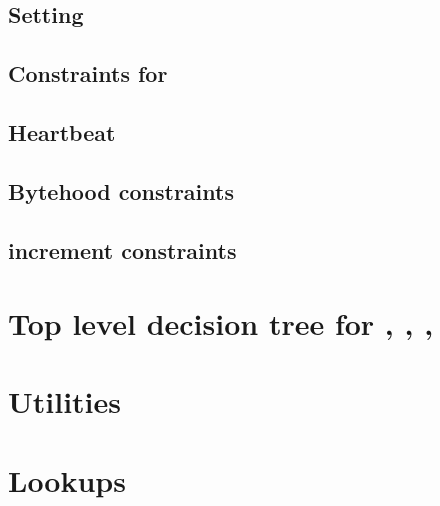 \subsection{Setting \accInputs{}}                                           \label{bls: setting acc pairings}                               
\subsection{Constraints for \blsStamp{}}                                    \label{bls: stamp}                                              
\subsection{Heartbeat}                                                      \label{bls: heartbeat}                                          
\subsection{Bytehood constraints}                                           \label{bls: bytehood and accumulator}                           
\subsection{\blsId{} increment constraints}                                 \label{bls: stamp increments}                                   

\section{Top level decision tree for \malformedDataInternalJustification{}, \malformedDataExternalJustification{}, \wellformedDataTrivial{}, \wellformedDataNontrivial{}}     \label{bls: top level}                                          


\section{Utilities}                       \label{bls: utilities}                       
\section{Lookups}                         \label{bls: lookups}                         
